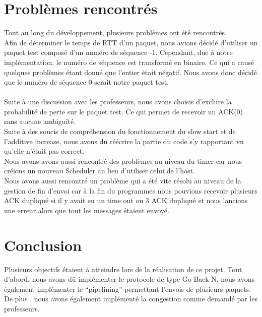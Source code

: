 \documentclass[a4paper,10pt]{article}
\begin{document}
\section{Problèmes rencontrés}
Tout au long du développement, plusieurs problèmes ont été rencontrés.\\
Afin de déterminer le temps de RTT d'un paquet, nous avions décidé d'utiliser un paquet test composé d'un numéro de séquence -1.
Cependant, due à notre implémentation, le numéro de séquence est transformé en binaire. Ce qui a causé quelques problèmes étant donné
que l'entier était négatif. Nous avons donc décidé que le numéro de séquence 0 serait notre paquet test.\\
\\
Suite à une discussion avec les professeurs, nous avons choisis d'exclure la probabilité de perte sur le paquet test.
Ce qui permet de recevoir un ACK(0) sans aucune ambiguïté.
\\
Suite à des soucis de compréhension du fonctionnement du slow start et de l'additive increase, nous avons du réécrire la partie du code s'y rapportant vu qu'elle n'était pas correct.
\\
Nous avons avons aussi rencontré des problèmes au niveau du timer car nous créions un nouveau Scheduler au lieu d'utiliser celui de l'host.
\\
Nous avons aussi rencontré un problème qui  a été vite résolu au niveau de la gestion de fin d'envoi car à la fin du programmes nous pouvions recevoir plusieurs ACK dupliqué si il y avait eu un time out ou 3 ACK dupliqué et nous lancions une erreur alors que tout les messages étaient envoyé.

\section{Conclusion}
Plusieurs objectifs étaient à atteindre lors de la réalisation de ce projet. Tout d'abord, nous avons dû implémenter le 
protocole de type Go-Back-N, nous avons également implémenter le ``pipelining'' permettant l'envois de plusieurs paquets.
De plus , nous avons également implémenté la congestion comme demandé par les professeurs.\\
\end{document}
